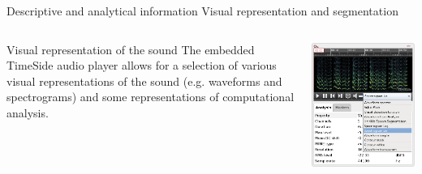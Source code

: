 \documentclass[final, hyperref, table]{beamer}
\begin{document}
  
\begin{frame}{Descriptive and analytical information}
{Visual representation and segmentation}
\scriptsize
\begin{columns}[T]
    \begin{column}{0.6\textwidth}
      \begin{block}{Visual representation of the sound}
       The embedded \alert{TimeSide} audio player allows for a selection
        of various visual representations of the sound (e.g. \alert{waveforms
        and spectrograms}) and some representations of computational
        \alert{analysis}.
      \end{block}
    \end{column}
    \begin{column}{0.3\textwidth}
      \includegraphics[width=\linewidth]{../img/sound_representation.png}
    \end{column}
  \end{columns}
\vspace{-1.5cm}
  \begin{columns}[T]

\end{columns}
\end{frame}
\end{document}
